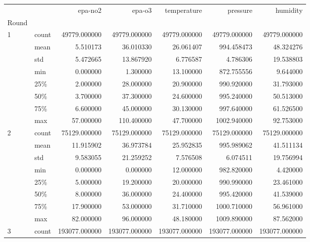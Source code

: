 \begin{tabular}{llrrrrr}
\toprule
  &       &        epa-no2 &         epa-o3 &    temperature &       pressure &       humidity \\
Round & {} &                &                &                &                &                \\
\midrule
1 & count &   49779.000000 &   49779.000000 &   49779.000000 &   49779.000000 &   49779.000000 \\
  & mean &       5.510173 &      36.010330 &      26.061407 &     994.458473 &      48.324276 \\
  & std &       5.472665 &      13.867920 &       6.776587 &       4.786306 &      19.538803 \\
  & min &       0.000000 &       1.300000 &      13.100000 &     872.755556 &       9.644000 \\
  & 25\% &       2.000000 &      28.000000 &      20.900000 &     990.920000 &      31.793000 \\
  & 50\% &       3.700000 &      37.300000 &      24.600000 &     995.240000 &      50.513000 \\
  & 75\% &       6.600000 &      45.000000 &      30.130000 &     997.640000 &      61.526500 \\
  & max &      57.000000 &     110.400000 &      47.700000 &    1002.940000 &      92.753000 \\
2 & count &   75129.000000 &   75129.000000 &   75129.000000 &   75129.000000 &   75129.000000 \\
  & mean &      11.915902 &      36.973784 &      25.952835 &     995.989062 &      41.511134 \\
  & std &       9.583055 &      21.259252 &       7.576508 &       6.074511 &      19.756994 \\
  & min &       0.000000 &       0.000000 &      12.000000 &     982.820000 &       4.420000 \\
  & 25\% &       5.000000 &      19.200000 &      20.000000 &     990.990000 &      23.461000 \\
  & 50\% &       8.000000 &      36.000000 &      24.400000 &     995.420000 &      41.539000 \\
  & 75\% &      17.900000 &      53.000000 &      31.710000 &    1000.710000 &      56.961000 \\
  & max &      82.000000 &      96.000000 &      48.180000 &    1009.890000 &      87.562000 \\
3 & count &  193077.000000 &  193077.000000 &  193077.000000 &  193077.000000 &  193077.000000 \\

\end{tabular}
